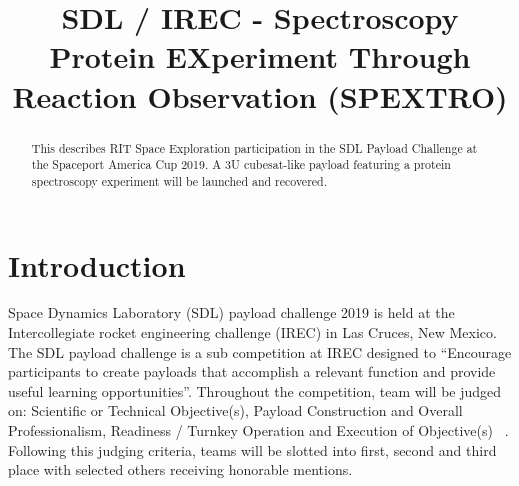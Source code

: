 \documentclass[conference]{IEEEtran} %
\title{SDL / IREC - Spectroscopy Protein EXperiment Through Reaction Observation (SPEXTRO)}
\author{
  \IEEEauthorblockN{%
    Dylan~Wagner\IEEEauthorrefmark{1},  %
    T.J.~Tarazevits\IEEEauthorrefmark{2},
    Keshav~Adhyay\IEEEauthorrefmark{3},
    and
    Matthew~Glazer\IEEEauthorrefmark{4}
  }
  \IEEEauthorblockA{%
    RIT Space Exploration, Rochester Institute of Technology \\ %
    Rochester, N.Y. \\
    Email:
    \IEEEauthorrefmark{1}drw6528@rit.edu,
    \IEEEauthorrefmark{2}tjt3085@rit.edu,
    \IEEEauthorrefmark{3}kar4669@rit.edu,
    \IEEEauthorrefmark{4}msg1254@rit.edu
  }

}
\begin{document}
\maketitle%

\begin{abstract}
This describes RIT Space Exploration participation in the SDL Payload Challenge at the Spaceport America Cup 2019. A 3U cubesat-like payload featuring a protein spectroscopy experiment will be launched and recovered.

\end{abstract}



\section{Introduction}
\label{sec:introduction}

 Space Dynamics Laboratory (SDL) payload challenge 2019 is held at the Intercollegiate rocket engineering challenge (IREC) in Las Cruces, New Mexico. The SDL payload challenge is a sub competition at IREC designed to “Encourage participants to create payloads that accomplish a relevant function and provide useful learning opportunities”. Throughout the competition, team will be judged on: Scientific or Technical Objective(s), Payload Construction and Overall Professionalism, Readiness / Turnkey Operation and Execution of Objective(s) ~\cite{testref}. Following this judging criteria, teams will be slotted into first, second and third place with selected others receiving honorable mentions.
\end{document}
